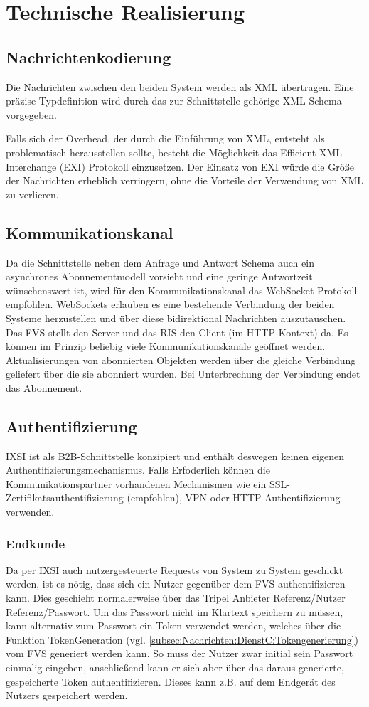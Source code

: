 \chapter{Technische Realisierung}
\label{sec:TechnischeRealisierung}


\section{Nachrichtenkodierung}
Die Nachrichten zwischen den beiden System werden als XML übertragen. Eine präzise Typdefinition wird durch das zur Schnittstelle gehörige XML Schema vorgegeben.

Falls sich der Overhead, der durch die Einführung von XML, entsteht als problematisch herausstellen sollte, besteht die Möglichkeit das Efficient XML Interchange (EXI) Protokoll einzusetzen. Der Einsatz von EXI würde die Größe der Nachrichten erheblich verringern, ohne die Vorteile der Verwendung von XML zu verlieren.

\section{Kommunikationskanal}
Da die Schnittstelle neben dem Anfrage und Antwort Schema auch ein asynchrones Abonnementmodell vorsieht und eine geringe Antwortzeit wünschenswert ist, wird für den Kommunikationskanal das WebSocket-Protokoll empfohlen. WebSockets erlauben es eine bestehende Verbindung der beiden Systeme herzustellen und über diese bidirektional Nachrichten auszutauschen. Das FVS stellt den Server und das RIS den Client (im HTTP Kontext) da. Es können im Prinzip beliebig viele Kommunikationskanäle geöffnet werden. Aktualisierungen von abonnierten Objekten werden über die gleiche Verbindung geliefert über die sie abonniert wurden. Bei Unterbrechung der Verbindung endet das Abonnement.

\section{Authentifizierung}
IXSI ist als B2B-Schnittstelle konzipiert und enthält deswegen keinen eigenen Authentifizierungsmechanismus. Falls Erfoderlich können die Kommunikationspartner vorhandenen Mechanismen wie ein SSL-Zertifikatsauthentifizierung (empfohlen), VPN oder HTTP Authentifizierung verwenden.

\subsection*{Endkunde}
Da per IXSI auch nutzergesteuerte Requests von System zu System geschickt werden, ist
es nötig, dass sich ein Nutzer gegenüber dem FVS authentifizieren kann. 
Dies geschieht normalerweise über das Tripel Anbieter Referenz/Nutzer Referenz/Passwort. Um das  Passwort nicht im Klartext speichern zu müssen, kann alternativ zum Passwort ein Token 
verwendet werden, welches über die Funktion TokenGeneration (vgl. \cref{subsec:Nachrichten:DienstC:Tokengenerierung}) vom FVS 
generiert werden kann. So muss der Nutzer zwar initial sein Passwort einmalig eingeben, anschließend kann er sich aber über das daraus generierte, gespeicherte Token
authentifizieren. Dieses kann z.B. auf dem Endgerät des Nutzers gespeichert werden.

